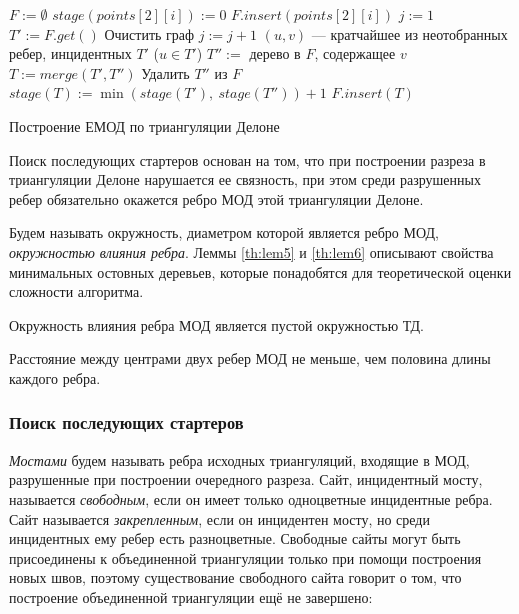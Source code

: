 \documentclass[12pt]{article}
\begin{document}
\begin{algorithm}[htb!]
\begin{algorithmic}[1]
	\State $F := \emptyset$
		\State $stage(points[2][i]) := 0$
		\State $F.insert(points[2][i])$
	\EndFor
	\State $j := 1$
		\State $T' := F.get()$
            \State Очистить граф
            \State $j := j + 1$
        \EndIf
        \State $(u, v)$ --- кратчайшее из неотобранных ребер, инцидентных $T'$ ($u \in T'$)
        \State $T'' := $ дерево в $F$, содержащее $v$
        \State $T := merge(T', T'')$
        \State Удалить $T''$ из $F$
        \State $stage(T) := \min(stage(T'),~stage(T'')) + 1$
        \State $F.insert(T)$
	\EndWhile
\EndProcedure
\end{algorithmic}
\caption{Построение ЕМОД по триангуляции Делоне}
\label{alg:mst}
\end{algorithm}

Поиск последующих стартеров основан на том, что при построении разреза в триангуляции Делоне нарушается ее связность,
при этом среди разрушенных ребер обязательно окажется ребро МОД этой триангуляции Делоне.

Будем называть окружность, диаметром которой является ребро МОД, {\itshape окружностью влияния ребра}.
Леммы \ref{th:lem5} и \ref{th:lem6} описывают свойства минимальных остовных деревьев,
которые понадобятся для теоретической оценки сложности алгоритма.

\begin{lemma}
\label{th:lem5}
Окружность влияния ребра МОД является пустой окружностью ТД.
\end{lemma}

\begin{lemma}
\label{th:lem6}
Расстояние между центрами двух ребер МОД не меньше, чем половина длины каждого ребра.
\end{lemma}

\subsubsection{Поиск последующих стартеров}
{\itshape Мостами} будем называть ребра исходных триангуляций,
входящие в МОД, разрушенные при построении очередного разреза.
Сайт, инцидентный мосту, называется {\itshape свободным}, если он имеет только одноцветные инцидентные ребра.
Сайт называется {\itshape закрепленным}, если он инцидентен мосту, но среди инцидентных ему ребер есть разноцветные.
Свободные сайты могут быть присоединены к объединенной триангуляции только при помощи построения новых швов,
поэтому существование свободного сайта говорит о том,
что построение объединенной триангуляции ещё не завершено:
\end{document}
